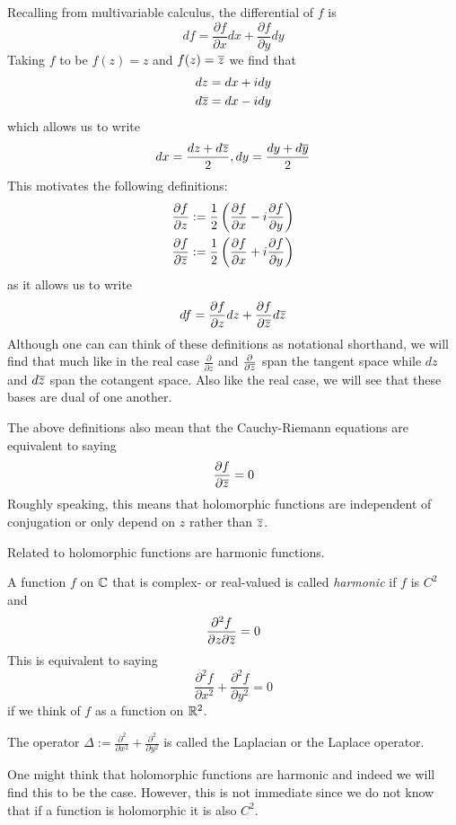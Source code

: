 Recalling from multivariable calculus, the differential of $f$ is
$$df = \frac{\partial f}{\partial x} dx + \frac{\partial f}{\partial y} dy$$
Taking $f$ to be $f(z) = z$ and $f(z) = \overline{z}$ we find that
\begin{align*}
    dz &= dx + idy\\
    d\overline{z} &= dx - idy
\end{align*}
which allows us to write
$$ dx = \frac{dz + d\overline{z}}{2}, dy = \frac{dy + d\overline{y}}{2} $$
This motivates the following definitions:
\begin{align*}
    \frac{\partial f}{\partial z} &:= \frac{1}{2} \left( \frac{\partial f}{\partial x} - i \frac{\partial f}{\partial y} \right)\\
    \frac{\partial f}{\partial \overline{z}} &:= \frac{1}{2} \left( \frac{\partial f}{\partial x} + i \frac{\partial f}{\partial y} \right)
\end{align*}
as it allows us to write
$$ df = \frac{\partial f}{\partial z} dz + \frac{\partial f}{\partial \overline{z}} d\overline{z} $$
Although one can can think of these definitions as notational shorthand, we will find that much like in the real case $\frac{\partial }{\partial z}$ and $\frac{\partial}{\partial \overline{z}}$ span the tangent space while $dz$ and $d\overline{z}$ span the cotangent space. Also like the real case, we will see that these bases are dual of one another.

The above definitions also mean that the Cauchy-Riemann equations are equivalent to saying 
$$ \frac{\partial f}{\partial \overline{z}} = 0 $$
Roughly speaking, this means that holomorphic functions are independent of conjugation or only depend on $z$ rather than $\overline{z}$. 

Related to holomorphic functions are harmonic functions.
\begin{definition}
A function $f$ on $\mathbb{C}$ that is complex- or real-valued is called \textit{harmonic} if $f$ is $C^2$ and
$$ \frac{\partial^2 f}{\partial z \partial \overline{z}} = 0 $$
This is equivalent to saying
$$ \frac{\partial^2 f}{\partial x^2} + \frac{\partial^2 f}{\partial y^2} = 0 $$
if we think of $f$ as a function on $\mathbb{R}^2$. 
\end{definition}
\begin{remark}
The operator $ \Delta := \frac{\partial^2}{\partial x^2} + \frac{\partial^2}{\partial y^2} $ is called the Laplacian or the Laplace operator.
\end{remark}
One might think that holomorphic functions are harmonic and indeed we will find this to be the case. However, this is not immediate since we do not know that if a function is holomorphic it is also $C^2$.

